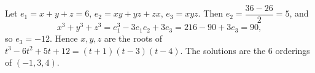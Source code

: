 Let $e_1=x+y+z=6$, $e_2=xy+yz+zx$, $e_3=xyz$. Then $e_2=\dfrac{36-26}{2}=5$, and
\[x^3+y^3+z^3=e_1^3-3e_1e_2+3e_3=216-90+3e_3=90,\]
so $e_3=-12$. Hence $x,y,z$ are the roots of $t^3-6t^2+5t+12=(t+1)(t-3)(t-4)$. The solutions are the $6$ orderings of $\boxed{(-1,3,4)}$.
